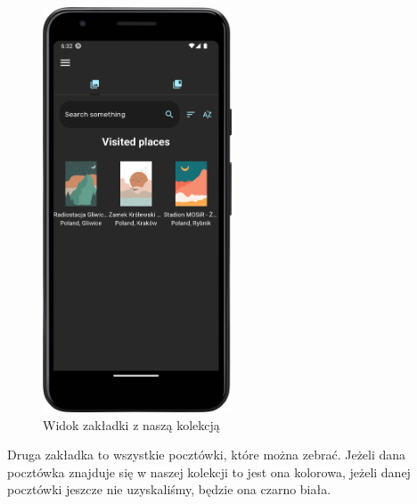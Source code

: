 \documentclass[a4paper,twoside,12pt]{book}
\begin{document}
\begin{figure}[H]
    \centering
    \includegraphics[width=0.5\textwidth]{mobile_ss/obrazki_nasze.png}
    \caption{Widok zakładki z naszą kolekcją}
\end{figure}

Druga zakładka to wszystkie pocztówki, które można zebrać. Jeżeli dana pocztówka znajduje się w naszej kolekcji to jest ona kolorowa, jeżeli danej pocztówki jeszcze nie uzyskaliśmy, będzie ona czarno biała. 
\end{document}
